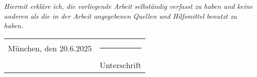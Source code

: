 \documentclass[12pt]{report}
\begin{document}


\newpage


\emph{Hiermit erkläre ich, die vorliegende Arbeit selbständig verfasst zu haben und keine anderen als die in der Arbeit angegebenen Quellen und Hilfsmittel benutzt zu haben.}

\vspace{2cm}  
\noindent
\begin{tabular}{p{7cm} p{7cm}}
    München, den 20.6.2025 & \rule{6cm}{0.4pt} \\  
    & Unterschrift
\end{tabular}
\end{document}
